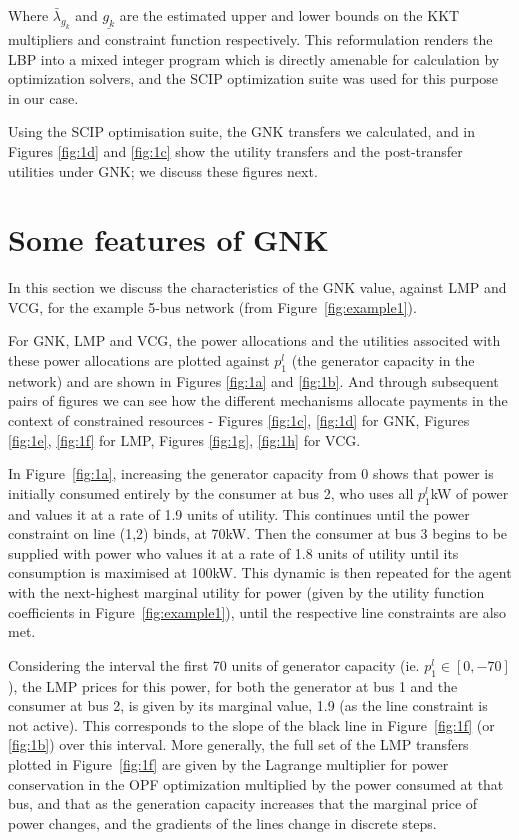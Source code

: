 Where $\bar{\lambda}_{g_k}$ and $\underline{g_k}$ are the estimated upper and lower bounds on the KKT multipliers and constraint function respectively.
This reformulation renders the LBP into a mixed integer program which is directly amenable for calculation by optimization solvers, and the SCIP optimization suite \cite{MaherFischerGallyetal.2017} was used for this purpose in our case.

Using the SCIP optimisation suite, the GNK transfers we calculated, and in Figures \ref{fig:1d} and \ref{fig:1c} show the utility transfers and the post-transfer utilities under GNK; we discuss these figures next.


\section{Some features of GNK}\label{sec:features}

In this section we discuss the characteristics of the GNK value, against LMP and VCG, for the example 5-bus network (from Figure~\ref{fig:example1}).

For GNK, LMP and VCG, the power allocations and the utilities associted with these power allocations are plotted against $p_1^l$ (the generator capacity in the network) and are shown in Figures \ref{fig:1a} and \ref{fig:1b}.
And through subsequent pairs of figures we can see how the different mechanisms allocate payments in the context of constrained resources - Figures \ref{fig:1c}, \ref{fig:1d} for GNK, Figures \ref{fig:1e}, \ref{fig:1f} for LMP, Figures \ref{fig:1g}, \ref{fig:1h} for VCG.

\iffigures
% 
%
\fi

In Figure~\ref{fig:1a}, increasing the generator capacity from $0$ shows that power is initially consumed entirely by the consumer at bus 2, 
who uses all $p_1^l$kW of power and values it at a rate of 1.9 units of utility. This continues until the power constraint on line (1,2) binds, at 70kW.
Then the consumer at bus 3 begins to be supplied with power who values it at a rate of 1.8 units of utility until its consumption is maximised at 100kW. 
This dynamic is then repeated for the agent with the next-highest marginal utility for power (given by the utility function coefficients in Figure~\ref{fig:example1}), until the respective line constraints are also met.

Considering the interval the first 70 units of generator capacity (ie. $p_1^l \in [0,-70]$), the LMP prices for this power, for both the generator at bus 1 and the consumer at bus 2, is given by its marginal value, 1.9 (as the line constraint is not active). This corresponds to the slope of the black line in Figure~\ref{fig:1f} (or \ref{fig:1b}) over this interval. 
More generally, the full set of the LMP transfers plotted in Figure~\ref{fig:1f} are given by the Lagrange multiplier for power conservation in the OPF optimization multiplied by the power consumed at that bus, and that as the generation capacity increases that the marginal price of power changes, and the gradients of the lines change in discrete steps.


